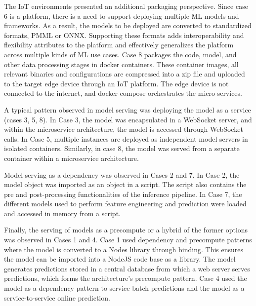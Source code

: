The IoT environments presented an additional packaging perspective. Since case 6 is a platform, there is a need to support deploying multiple ML models and frameworks. As a result, the models to be deployed are converted to standardized formats, PMML or ONNX. Supporting these formats adds interoperability and flexibility attributes to the platform and effectively generalizes the platform across multiple kinds of ML use cases. Case 8 packages the code, model, and other data processing stages in docker containers. These container images, all relevant binaries and configurations are compressed into a zip file and uploaded to the target edge device through an IoT platform. The edge device is not connected to the internet, and docker-compose orchestrates the micro-services.


A typical pattern observed in model serving was deploying the model as a service (cases 3, 5, 8). In Case 3, the model was encapsulated in a WebSocket server, and within the microservice architecture, the model is accessed through WebSocket calls. In Case 5, multiple instances are deployed as independent model servers in isolated containers. Similarly, in case 8, the model was served from a separate container within a microservice architecture.

Model serving as a dependency was observed in Cases 2 and 7. In Case 2, the model object was imported as an object in a script. The script also contains the pre and post-processing functionalities of the inference pipeline. In Case 7, the different models used to perform feature engineering and prediction were loaded and accessed in memory from a script. 

Finally, the serving of models as a precompute or a hybrid of the former options was observed in Cases 1 and 4. Case 1 used dependency and precompute patterns where the model is converted to a  Nodes library through binding. This ensures the model can be imported into a NodeJS code base as a library. The model generates predictions stored in a central database from which a web server serves predictions, which forms the architecture's precompute pattern. Case 4 used the model as a dependency pattern to service batch predictions and the model as a service-to-service online prediction.

